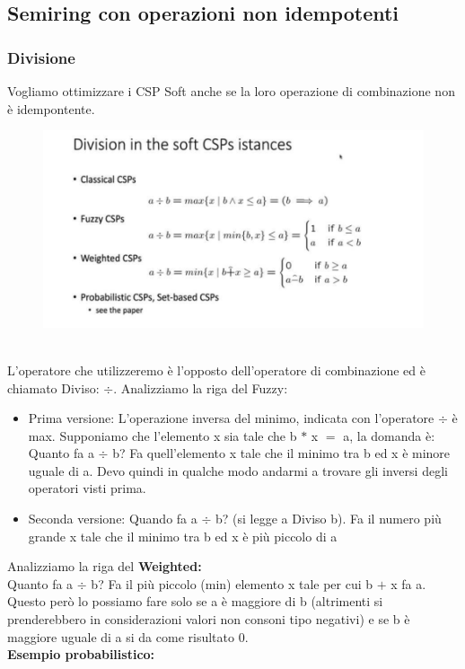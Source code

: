 \subsection{Semiring con operazioni non idempotenti}
\subsubsection{Divisione}
Vogliamo ottimizzare i CSP Soft anche se la loro operazione di combinazione non è idempontente.
\begin{figure}[htp]
	\centering
    \includegraphics[width=12cm, keepaspectratio]{img/Cap5/DIvisione.png}
\end{figure}
\\L’operatore che utilizzeremo è l’opposto dell’operatore di combinazione ed è chiamato Diviso: $\div$. Analizziamo la riga del Fuzzy:
\begin{itemize}
    \item Prima versione: L’operazione inversa del minimo, indicata con l’operatore $\div$ è max. Supponiamo che l’elemento x sia tale che b $*$ x $=$ a, la domanda è: Quanto fa a $\div$ b? Fa quell’elemento x tale che il minimo tra b ed x è minore uguale di a. Devo quindi in qualche modo andarmi a trovare gli inversi degli operatori visti prima.
    \item  Seconda versione: Quando fa a $\div$ b? (si legge a Diviso b). Fa il numero più grande x tale che il minimo tra b ed x è più piccolo di a
\end{itemize}
Analizziamo la riga del \textbf{Weighted:}
\\Quanto fa a $\div$ b? Fa il più piccolo (min) elemento x tale per cui b $+$ x fa a. Questo però lo possiamo fare solo se a è maggiore di b (altrimenti si prenderebbero in considerazioni valori non consoni tipo negativi) e se b è maggiore uguale di a si da come risultato 0.
\\\textbf{Esempio probabilistico:}
